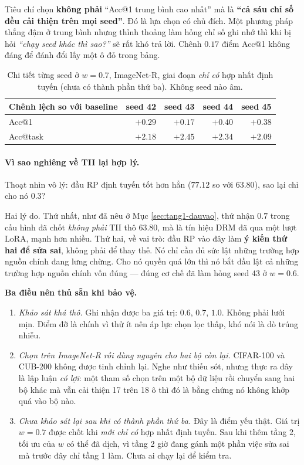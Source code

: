 \documentclass[11pt,a4paper]{article}
\newenvironment{luuy}{\begin{leftbar}\noindent\ignorespaces}{\end{leftbar}}
\begin{document}
Tiêu chí chọn \textbf{không phải} ``Acc@1 trung bình cao nhất'' mà là \textbf{``cả
sáu chỉ số đều cải thiện trên mọi seed''}. Đó là lựa chọn có chủ đích. Một phương
pháp thắng đậm ở trung bình nhưng thỉnh thoảng làm hỏng chỉ số ghi nhớ thì khi bị
hỏi \emph{``chạy seed khác thì sao?''} sẽ rất khó trả lời. Chênh $0.17$ điểm
Acc@1 không đáng để đánh đổi lấy một ô đỏ trong bảng.

\begin{table}[htbp]
\centering
\caption{Chi tiết từng seed ở $w = 0.7$, ImageNet-R, giai đoạn \emph{chỉ có} hợp
nhất định tuyến (chưa có thành phần thứ ba). Không seed nào âm.}
\label{tab:w07-seed}
\begin{tabular}{@{}lrrrr@{}}
\toprule
Chênh lệch so với baseline & seed 42 & seed 43 & seed 44 & seed 45 \\
\midrule
Acc@1    & $+0.29$ & $+0.17$ & $+0.40$ & $+0.38$ \\
Acc@task & $+2.18$ & $+2.45$ & $+2.34$ & $+2.09$ \\
\bottomrule
\end{tabular}
\end{table}

\paragraph{Vì sao nghiêng về TII lại hợp lý.}
Thoạt nhìn vô lý: đầu RP định tuyến tốt hơn hẳn ($77.12$ so với $63.80$), sao lại
chỉ cho nó $0.3$?

Hai lý do. Thứ nhất, như đã nêu ở Mục \ref{sec:tang1-dauvao}, thứ nhận $0.7$
trong cấu hình đã chốt \emph{không phải} TII thô $63.80$, mà là tín hiệu DRM đã
qua một lượt LoRA, mạnh hơn nhiều. Thứ hai, về vai trò: đầu RP vào đây làm
\textbf{ý kiến thứ hai để sửa sai}, không phải để thay thế. Nó chỉ cần đủ sức lật
những trường hợp nguồn chính đang lưng chừng. Cho nó quyền quá lớn thì nó bắt đầu
lật cả những trường hợp nguồn chính vốn đúng --- đúng cơ chế đã làm hỏng seed 43
ở $w = 0.6$.

\begin{luuy}
\textbf{Ba điều nên thủ sẵn khi bảo vệ.}
\begin{enumerate}
\item \emph{Khảo sát khá thô.} Ghi nhận được ba giá trị: $0.6$, $0.7$, $1.0$.
      Không phải lưới mịn. Điểm đỡ là chính vì thử ít nên áp lực chọn lọc thấp,
      khó nói là dò trúng nhiễu.
\item \emph{Chọn trên ImageNet-R rồi dùng nguyên cho hai bộ còn lại.} CIFAR-100
      và CUB-200 không được tinh chỉnh lại. Nghe như thiếu sót, nhưng thực ra
      đây là lập luận \emph{có lợi}: một tham số chọn trên một bộ dữ liệu rồi
      chuyển sang hai bộ khác mà vẫn cải thiện 17 trên 18 ô thì đó là bằng chứng
      nó không khớp quá vào bộ nào.
\item \emph{Chưa khảo sát lại sau khi có thành phần thứ ba.} Đây là điểm yếu
      thật. Giá trị $w = 0.7$ được chốt khi \emph{mới chỉ có} hợp nhất định
      tuyến. Sau khi thêm tầng 2, tối ưu của $w$ có thể đã dịch, vì tầng 2 giờ
      đang gánh một phần việc sửa sai mà trước đây chỉ tầng 1 làm. Chưa ai chạy
      lại để kiểm tra.
\end{enumerate}
\end{luuy}
\end{document}
